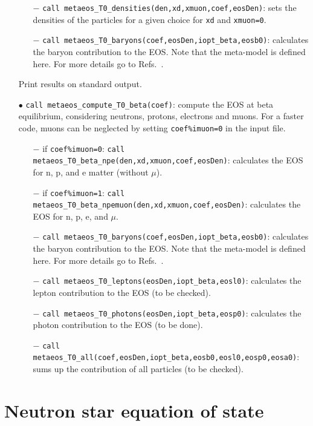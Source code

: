 \documentclass[11pt]{article}
\newcommand{\code}[1]{\colorbox{light-gray}{\mbox{\texttt{#1}}}}
\begin{document}
\begin{enumerate}
\begin{enumerate}
\item[$-$] \code{call metaeos\_T0\_densities(den,xd,xmuon,coef,eosDen)}: sets the densities of the particles for a given choice for \code{xd} and \code{xmuon=0}.
\item[$-$] \code{call metaeos\_T0\_baryons(coef,eosDen,iopt\_beta,eosb0)}: calculates the baryon contribution to the EOS. Note that the meta-model is defined here. For more details go to Refs.~\cite{Margueron2018a,Margueron2018b}.
\end{enumerate}
Print results on standard output.
\item[$\bullet$] \code{call metaeos\_compute\_T0\_beta(coef)}: compute the EOS at beta equilibrium, considering neutrons, protons, electrons and muons. For a faster code, muons can be neglected by setting \code{coef\%imuon=0} in the input file.
\begin{enumerate}
\item[$-$] if \code{coef\%imuon=0}: \code{call metaeos\_T0\_beta\_npe(den,xd,xmuon,coef,eosDen)}: calculates the EOS for n, p, and e matter (without $\mu$).
\item[$-$] if \code{coef\%imuon=1}: \code{call metaeos\_T0\_beta\_npemuon(den,xd,xmuon,coef,eosDen)}: calculates the EOS for n, p, e, and $\mu$.
\item[$-$] \code{call metaeos\_T0\_baryons(coef,eosDen,iopt\_beta,eosb0)}: calculates the baryon contribution to the EOS. Note that the meta-model is defined here. For more details go to Refs.~\cite{Margueron2018a,Margueron2018b}.
\item[$-$] \code{call metaeos\_T0\_leptons(eosDen,iopt\_beta,eosl0)}: calculates the lepton contribution to the EOS (to be checked).
\item[$-$] \code{call metaeos\_T0\_photons(eosDen,iopt\_beta,eosp0)}: calculates the photon contribution to the EOS (to be done).
\item[$-$] \code{call metaeos\_T0\_all(coef,eosDen,iopt\_beta,eosb0,eosl0,eosp0,eosa0)}: sums up the contribution of all particles (to be checked).
\end{enumerate}
\end{enumerate}





\section{Neutron star equation of state}
\label{sec:nsEOS}
\end{document}
